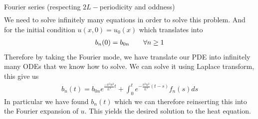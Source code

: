 \begin{parag}{Fourier series (respecting $2L-$periodicity and oddness)}
\begin{align*}
	\end{align*}
	We need to solve infinitely many equations in order to solve this problem. And for the initial condition $u\left(x, 0\right) = u_0\left(x\right)$ which translates into 
	\begin{align*} 
		b_n\left(0\right) = b_{0n} \mathspace \mathspace \forall n \geq 1
	\end{align*}
	Therefore by taking the Fourier mode, we have translate our PDE into infinitely many ODEs that we know how to solve. We can solve it using Laplace transform, this give us 
	\begin{align*} 
		b_n\left(t\right) =  b_{0n}e^{\frac{-\pi^2 n^2}{L^2}t} + \int_{0}^{t} e^{-\frac{\pi^2n^2}{L^2}\left(t - s\right)} f_n\left(s\right) ds
	\end{align*}
	In particular we have found $b_n\left(t\right)$ which we can therefore reinserting this into the Fourier expansion of $u$. This yields the desired solution to the heat equation.
\end{parag}


